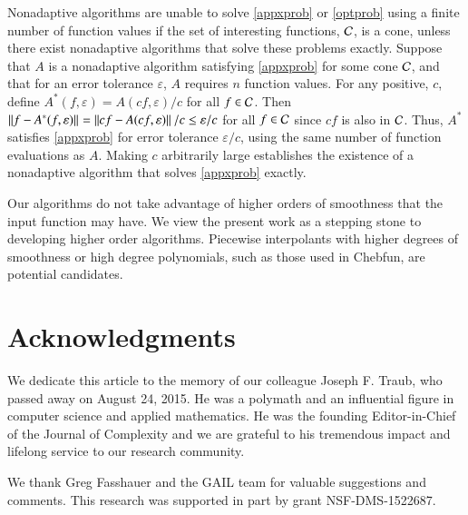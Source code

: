 \documentclass[review]{elsarticle}
\newcommand{\abstol}{\varepsilon}
\theoremstyle{definition}
\begin{document}
Nonadaptive algorithms are unable to solve \eqref{appxprob} or
\eqref{optprob} using a finite number of function values if the set of
interesting functions, $\mathcal{C}$, is a cone, unless there exist nonadaptive
algorithms that solve these problems exactly. Suppose that $A$ is a nonadaptive
algorithm satisfying \eqref{appxprob} for some cone $\mathcal{C}$, and that for an error
tolerance $\abstol$, $A$ requires $n$ function values. For any positive, $c$,
define $A^*(f,\abstol) = A(cf,\abstol)/c$ for all $f \in \mathcal{C}$. Then $\norm{f -
A^*(f,\abstol)} = \norm{cf - A(cf,\abstol)}/c\le \abstol/c$ for all $f \in \mathcal{C}$
since $cf$ is also in $\mathcal{C}$. Thus, $A^*$ satisfies \eqref{appxprob} for error
tolerance $\abstol/c$, using the same number of function evaluations as $A$.
Making $c$ arbitrarily large establishes the existence of a nonadaptive
algorithm that solves \eqref{appxprob} exactly.

Our algorithms do not take advantage of higher orders of
smoothness that the input function may have. We view the present work as a
stepping stone to developing higher order algorithms. Piecewise interpolants
with higher degrees of smoothness or high degree polynomials, such as those used
in Chebfun, are potential candidates.


\section*{Acknowledgments}

We dedicate this article to the memory of our colleague Joseph F. Traub, who
passed away on August 24, 2015. He was a polymath and an influential figure in
computer science and applied mathematics. He was the founding Editor-in-Chief of
the Journal of Complexity and we are grateful to his tremendous impact and lifelong 
service to our research community.

We thank Greg Fasshauer and the GAIL team for
valuable suggestions and comments. This research was supported in part by grant
NSF-DMS-1522687.





\end{document}
